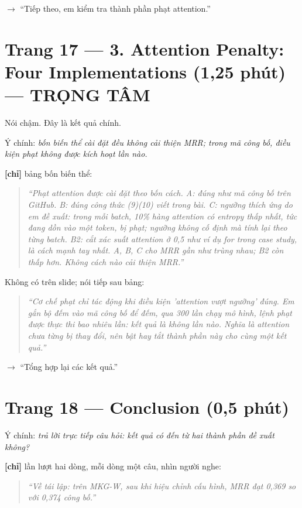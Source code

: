 \documentclass[11pt,a4paper]{article}
\begin{document}
\textbf{$\to$} ``Tiếp theo, em kiểm tra thành phần phạt attention.''


\section*{Trang 17 --- 3. Attention Penalty: Four Implementations (1,25 phút) --- TRỌNG TÂM}

Nói chậm. Đây là kết quả chính.


Ý chính: \emph{bốn biến thể cài đặt đều không cải thiện MRR; trong mã công bố, điều kiện phạt không được kích hoạt lần nào.}


\textbf{[chỉ]} bảng bốn biến thể:


\begin{quote}\itshape ``Phạt attention được cài đặt theo bốn cách. A: đúng như mã công bố trên GitHub. B: đúng công thức (9)(10) viết trong bài. C: ngưỡng thích ứng do em đề xuất: trong mỗi batch, 10\% hàng attention có entropy thấp nhất, tức đang dồn vào một token, bị phạt; ngưỡng không cố định mà tính lại theo từng batch. B2: cắt xác suất attention ở 0,5 như ví dụ \emph{for} trong case study, là cách mạnh tay nhất. A, B, C cho MRR gần như trùng nhau; B2 còn thấp hơn. Không cách nào cải thiện MRR.''\end{quote}

Không có trên slide; nói tiếp sau bảng:


\begin{quote}\itshape ``Cơ chế phạt chỉ tác động khi điều kiện 'attention vượt ngưỡng' đúng. Em gắn bộ đếm vào mã công bố để đếm, qua 300 lần chạy mô hình, lệnh phạt được thực thi bao nhiêu lần: kết quả là không lần nào. Nghĩa là attention chưa từng bị thay đổi, nên bật hay tắt thành phần này cho cùng một kết quả.''\end{quote}

\textbf{$\to$} ``Tổng hợp lại các kết quả.''


\section*{Trang 18 --- Conclusion (0,5 phút)}

Ý chính: \emph{trả lời trực tiếp câu hỏi: kết quả có đến từ hai thành phần đề xuất không?}


\textbf{[chỉ]} lần lượt hai dòng, mỗi dòng một câu, nhìn người nghe:


\begin{quote}\itshape ``Về tái lập: trên MKG-W, sau khi hiệu chỉnh cấu hình, MRR đạt 0,369 so với 0,374 công bố.''\end{quote}
\end{document}
